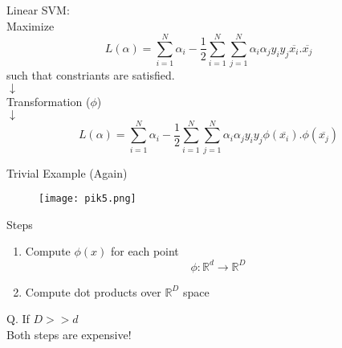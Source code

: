 \documentclass{beamer}
\begin{document}
	\begin{frame}{}
	    Linear SVM:\\
	    \hspace{1cm} Maximize\\
	    \begin{equation*}
	        L(\alpha) = \sum_{i=1}^{N}\alpha_{i} - \frac{1}{2}\sum_{i=1}^{N}\sum_{j=1}^{N}\alpha_{i}\alpha_{j}y_{i}y_{j}\overline{x_{i}}.\overline{x_{j}}
	    \end{equation*}
	    \hspace{1cm} such that constriants are satisfied.\\
	   \hspace{5cm} $\downarrow$\\
	   \hspace{3.8cm} Transformation ($\phi$)\\
	   \hspace{5cm} $\downarrow$\\
	   \begin{equation*}
	       L(\alpha) = \sum_{i=1}^{N}\alpha_{i} - \frac{1}{2}\sum_{i=1}^{N}\sum_{j=1}^{N}\alpha_{i}\alpha_{j}y_{i}y_{j}\phi(\overline{x_{i}}).\phi(\overline{x_{j}})
	   \end{equation*}
	\end{frame}
	\begin{frame}{Trivial Example (Again)}
	    \begin{figure}
       \hspace{-1cm}\texttt{[image: pik5.png]}
      \end{figure}
	\end{frame}
	\begin{frame}{Steps}
	    \begin{enumerate}
	        \item Compute $\phi(x)$ for each point \\
	        \begin{equation*}
	            \phi: \mathbb{R}^{d} \rightarrow \mathbb{R}^{D}
	        \end{equation*}
	        \item Compute dot products over $\mathbb{R}^{D}$ space
	    \end{enumerate}
	    \hspace{0.1cm} Q. If $D >> d$ \\
	    \hspace{0.6cm} Both steps are expensive!
	\end{frame}
\end{document}
